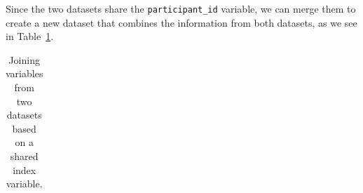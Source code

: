 \documentclass[
  letterpaper,
  DIV=11,
  numbers=noendperiod]{scrreprt}
\theoremstyle{definition}
\theoremstyle{remark}
\begin{document}
Since the two datasets share the \texttt{participant\_id} variable, we
can merge them to create a new dataset that combines the information
from both datasets, as we see in Table~\ref{tbl-ud-merge-join}.

\begin{longtable}[]{@{}
  >{\raggedright\arraybackslash}p{}
  >{\raggedright\arraybackslash}p{}
  >{\raggedright\arraybackslash}p{}
  >{\raggedright\arraybackslash}p{}
  >{\raggedright\arraybackslash}p{}
  >{\raggedright\arraybackslash}p{}
  >{\raggedright\arraybackslash}p{}@{}}

\caption{\label{tbl-ud-merge-join}Joining variables from two datasets
based on a shared index variable.}

\tabularnewline


\end{longtable}
\end{document}

